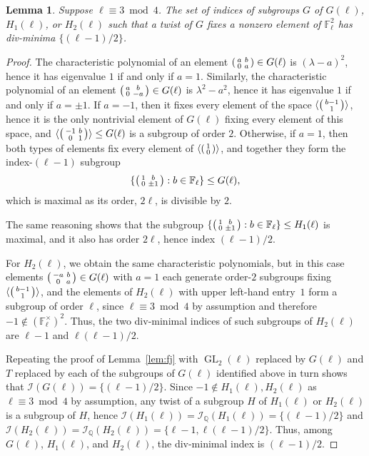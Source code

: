 \documentclass[table,dvipsnames]{amsart}
\newcommand{\F}{\mathbb{F}}
\newcommand{\Q}{\mathbb{Q}}
\newcommand{\GL}{\operatorname{GL}}
\newcommand{\I}{\mathcal{I}}
\newcommand{\angles}[1]{\langle #1\rangle}
\newcommand{\smallmat}[4]{\begin{psmallmatrix}#1&#2\\#3&#4\end{psmallmatrix}}
\newcommand{\smallvect}[2]{\begin{psmallmatrix}#1\\#2\end{psmallmatrix}}
\newtheorem{lemma}[theorem]{Lemma}
\numberwithin{equation}{section}
\begin{document}
\begin{lemma}
\label{lem:bj}
Suppose $\ell\equiv 3\bmod 4$. The set of indices of subgroups $G$ of $G(\ell)$, $H_1(\ell)$, or $H_2(\ell)$ such that a twist of $G$ fixes a nonzero element of $\F_\ell^2$ has div-minima $\{(\ell-1)/2\}$.
\end{lemma}
\begin{proof}
The characteristic polynomial of an element $\smallmat{a}{b}{0}{a}\in G(\ell)$ is $(\lambda-a)^2$, hence it has eigenvalue $1$ if and only if $a=1$. Similarly, the characteristic polynomial of an element $\smallmat{a}{b}{0}{-a}\in G(\ell)$ is $\lambda^2-a^2$, hence it has eigenvalue $1$ if and only if $a=\pm 1$. If $a=-1$, then it fixes every element of the space $\angles{\smallvect{b-1}{1}}$, hence it is the only nontrivial element of $G(\ell)$ fixing every element of this space, and $\angles{\smallmat{-1}{b}{0}{1}}\le G(\ell)$ is a subgroup of order $2$. Otherwise, if $a=1$, then both types of elements fix every element of $\angles{\smallvect{1}{0}}$, and together they form the index-$(\ell-1)$ subgroup
\begin{equation*}
\{\smallmat{1}{b}{0}{\pm 1}:b\in\F_\ell\}\le G(\ell),
\end{equation*}
which is maximal as its order, $2\ell$, is divisible by $2$.

The same reasoning shows that the subgroup $\{\smallmat{1}{b}{0}{\pm 1}:b\in\F_\ell\}\le H_1(\ell)$ is maximal, and it also has order $2\ell$, hence index $(\ell-1)/2$.

For $H_2(\ell)$, we obtain the same characteristic polynomials, but in this case elements $\smallmat{-a}{b}{0}{a}\in G(\ell)$ with $a=1$ each generate order-$2$ subgroups fixing $\angles{\smallvect{b-1}{1}}$, and the elements of $H_2(\ell)$ with upper left-hand entry~$1$ form a subgroup of order $\ell$, since $\ell\equiv 3\bmod{4}$ by assumption and therefore $-1\notin(\F_\ell^\times)^2$. Thus, the two div-minimal indices of such subgroups of $H_2(\ell)$ are $\ell-1$ and $\ell(\ell-1)/2$.

Repeating the proof of Lemma~\ref{lem:fj} with $\GL_2(\ell)$ replaced by $G(\ell)$ and $T$ replaced by each of the subgroups of $G(\ell)$ identified above in turn shows that $\I(G(\ell))=\{(\ell-1)/2\}$. Since $-1\notin H_1(\ell),H_2(\ell)$ as $\ell\equiv 3\bmod{4}$ by assumption, any twist of a subgroup $H$ of $H_1(\ell)$ or $H_2(\ell)$ is a subgroup of $H$, hence $\I(H_1(\ell))=\I_\Q(H_1(\ell))=\{(\ell-1)/2\}$ and $\I(H_2(\ell))=\I_\Q(H_2(\ell))=\{\ell-1,\ell(\ell-1)/2\}$. Thus, among $G(\ell)$, $H_1(\ell)$, and $H_2(\ell)$, the div-minimal index is $(\ell-1)/2$.
\end{proof}



\end{document}
